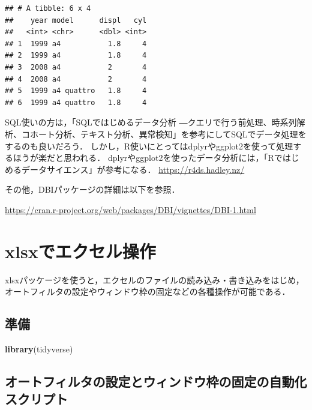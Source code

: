 \documentclass[
]{article}
\newenvironment{Shaded}{\begin{snugshade}}{\end{snugshade}}
\newcommand{\FunctionTok}[1]{\textcolor[rgb]{0.13,0.29,0.53}{\textbf{#1}}}
\newcommand{\NormalTok}[1]{#1}
\begin{document}
\begin{verbatim}
## # A tibble: 6 x 4
##    year model      displ   cyl
##   <int> <chr>      <dbl> <int>
## 1  1999 a4           1.8     4
## 2  1999 a4           1.8     4
## 3  2008 a4           2       4
## 4  2008 a4           2       4
## 5  1999 a4 quattro   1.8     4
## 6  1999 a4 quattro   1.8     4
\end{verbatim}

SQL使いの方は，「SQLではじめるデータ分析 ―クエリで行う前処理、時系列解析、コホート分析、テキスト分析、異常検知」を参考にしてSQLでデータ処理をするのも良いだろう．
しかし，R使いにとってはdplyrやggplot2を使って処理するほうが楽だと思われる．
dplyrやggplot2を使ったデータ分析には，「Rではじめるデータサイエンス」が参考になる．
\url{https://r4ds.hadley.nz/}

その他，DBIパッケージの詳細は以下を参照．

\url{https://cran.r-project.org/web/packages/DBI/vignettes/DBI-1.html}

\hypertarget{xlsx}{%
\section{xlsxでエクセル操作}\label{xlsx}}

xlsxパッケージを使うと，エクセルのファイルの読み込み・書き込みをはじめ，
オートフィルタの設定やウィンドウ枠の固定などの各種操作が可能である．

\hypertarget{ux6e96ux5099-14}{%
\subsection{準備}\label{ux6e96ux5099-14}}

\begin{Shaded}
\begin{Highlighting}[]
\FunctionTok{library}\NormalTok{(tidyverse)}
\end{Highlighting}
\end{Shaded}

\hypertarget{ux30aaux30fcux30c8ux30d5ux30a3ux30ebux30bfux306eux8a2dux5b9aux3068ux30a6ux30a3ux30f3ux30c9ux30a6ux67a0ux306eux56faux5b9aux306eux81eaux52d5ux5316ux30b9ux30afux30eaux30d7ux30c8}{%
\subsection{オートフィルタの設定とウィンドウ枠の固定の自動化スクリプト}\label{ux30aaux30fcux30c8ux30d5ux30a3ux30ebux30bfux306eux8a2dux5b9aux3068ux30a6ux30a3ux30f3ux30c9ux30a6ux67a0ux306eux56faux5b9aux306eux81eaux52d5ux5316ux30b9ux30afux30eaux30d7ux30c8}}
\end{document}
